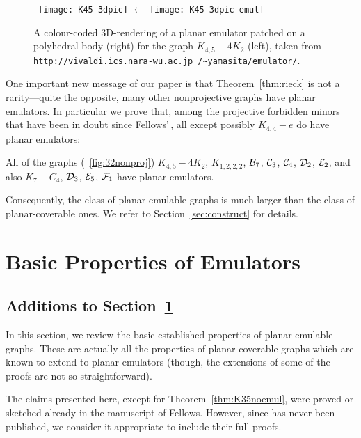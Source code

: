 \documentclass[envcountsect,envcountsame]{llncs}
\def\ca#1{{\cal #1}}
\begin{document}
\begin{figure}[tb]
\centering
~\hbox{\texttt{[image: K45-3dpic]}}
	\qquad{}\hbox{\Large$\leftarrow$}\qquad
	\texttt{[image: K45-3dpic-emul]}
\caption{A colour-coded 3D-rendering of a planar emulator patched on a polyhedral body (right) for the
	 graph \mbox{$K_{4,5}-4K_2$} (left), taken from
	{\scriptsize\tt http://vivaldi.ics.nara-wu.ac.jp /\~{}yamasita/emulator/}.}
\label{fig:K45.3D}
\end{figure}

One important new message of our paper is that Theorem~\ref{thm:rieck} is
not a rarity---quite the opposite, many other nonprojective graphs have
planar emulators.
In particular we prove that, 
among the projective forbidden minors that have been in
doubt since Fellows'\,\cite{cit:femul}, all except possibly
$K_{4,4}-e$ do have planar emulators:

\begin{theorem}
\label{thm:main}
All of the graphs (\figurename~\ref{fig:32nonproj})
$K_{4,5}-4K_2$, $K_{1,2,2,2}$, $\ca B_7$, $\ca C_3$,
$\ca C_4$, $\ca D_2$, $\ca E_2$, and also $K_7-C_4$, $\ca D_3$,
$\ca E_5$, $\ca F_1$ have planar emulators.
\end{theorem}
Consequently, the class of planar-emulable graphs is much larger than
the class of planar-coverable ones.
We refer to Section~\ref{sec:construct} for details.








\section{Basic Properties of Emulators}
\label{sec:basic}
\begin{onlyaccum}
\subsection{Additions to Section~\ref{sec:basic}}
\end{onlyaccum}

In this section, we review
the basic established properties of planar-emulable graphs.
These are actually all the properties of planar-coverable graphs
which are known to extend to planar emulators
(though, the extensions of some of the proofs are not so straightforward).

The claims presented here, except for Theorem~\ref{thm:K35noemul},
were proved or sketched already in the manuscript \cite{cit:femul} of
Fellows.
However, since \cite{cit:femul} has never been published, we consider it
appropriate to include their full proofs.
\end{document}

